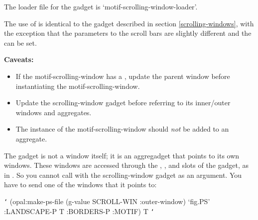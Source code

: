 \begin{center}
\end{center}

The loader file for the  gadget is
`motif-scrolling-window-loader'.

The use of  is identical to the
 gadget described in section
\ref{scrolling-windows}, with the exception that the parameters to the scroll
bars are slightly different and the  can be set.

{\bf Caveats:
\begin{itemize}
\item If the motif-scrolling-window has a , update the parent
window before instantiating the motif-scrolling-window.

\item Update the scrolling-window gadget before referring to its inner/outer
windows and aggregates.

\item The instance of the motif-scrolling-window should {\it not} be added to
an aggregate.
\end{itemize}}

The  gadget is not a window itself; it is
an aggregadget that points to its own windows.  These windows are accessed
through the , , and
 slots of the gadget, as in
.  So you cannot call
 with the scrolling-window gadget as an argument.  You
have to send one of the windows that it points to:

\begin{programexample}
{\tt\char`\>} (opal:make-ps-file (g-value SCROLL-WIN :outer-window)
                     `fig.PS' :LANDSCAPE-P T :BORDERS-P :MOTIF)
T
{\tt\char`\>}
\end{programexample}


